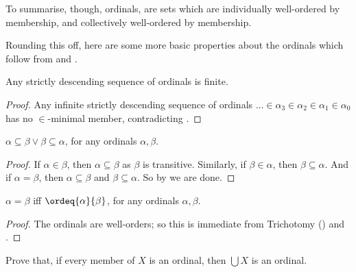 \documentclass[../../../include/open-logic-section]{subfiles}
\begin{document}
To summarise, though, ordinals, are sets which are individually well-ordered by membership, and collectively well-ordered by membership. 

Rounding this off, here are some more basic properties about the ordinals which follow from  and . 
\begin{prop}Any strictly descending sequence of ordinals is finite.
\end{prop}
\begin{proof}
	Any infinite strictly descending sequence of ordinals $\ldots \in \alpha_3 \in \alpha_2 \in \alpha_1 \in \alpha_0$ has no $\in$-minimal member, contradicting .
\end{proof}
\begin{prop}
	$\alpha \subseteq \beta \lor \beta \subseteq \alpha$, for any ordinals $\alpha, \beta$.
\end{prop}
\begin{proof}
	If $\alpha \in \beta$, then $\alpha \subseteq \beta$ as $\beta$ is transitive. Similarly, if $\beta \in \alpha$, then $\beta \subseteq \alpha$. And if $\alpha = \beta$, then $\alpha \subseteq \beta$ and $\beta \subseteq \alpha$. So by    we are done.
\end{proof}
\begin{prop}
	$\alpha = \beta$ iff $\ordeq{\alpha}{\beta}$, for any ordinals $\alpha, \beta$.
\end{prop}
\begin{proof}
	The ordinals are well-orders; so this is immediate from Trichotomy () and . 
\end{proof}
\begin{prob}
	Prove that, if every member of $X$ is an ordinal, then $\bigcup X$ is an ordinal.
\end{prob}
\end{document}
